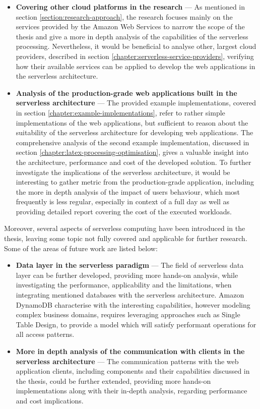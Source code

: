 \begin{itemize}
   \item \textbf{Covering other cloud platforms in the research} ---
   As mentioned in section \ref{section:research-approach}, the research focuses mainly on the services provided by the Amazon Web Services to narrow the scope of the thesis and give a more in depth analysis of the capabilities of the serverless processing.
   Nevertheless, it would be beneficial to analyse other, largest cloud providers, described in section \ref{chapter:serverless-service-providers}, verifying how their available services can be applied to develop the web applications in the serverless architecture.
   \item \textbf{Analysis of the production-grade web applications built in the serverless architecture} ---
   The provided example implementations, covered in section \ref{chapter:example-implementations}, refer to rather simple implementations of the web applications, but sufficient to reason about the suitability of the serverless architecture for developing web applications.
   The comprehensive analysis of the second example implementation, discussed in section \ref{chapter:latex-processing-optimisation}, gives a valuable insight into the architecture, performance and cost of the developed solution.
   To further investigate the implications of the serverless architecture, it would be interesting to gather metric from the production-grade application, including the more in depth analysis of the impact of users behaviour, which most frequently is less regular, especially in context of a full day as well as providing detailed report covering the cost of the executed workloads.
\end{itemize}

Moreover, several aspects of serverless computing have been introduced in the thesis, leaving some topic not fully covered and applicable for further research.
Some of the areas of future work are listed below:

\begin{itemize}
   \item \textbf{Data layer in the serverless paradigm} ---
   The field of serverless data layer can be further developed, providing more hands-on analysis, while investigating the performance, applicability and the limitations, when integrating mentioned databases with the serverless architecture.
   Amazon DynamoDB characterise with the interesting capabilities, however modeling complex business domains, requires leveraging approaches such as Single Table Design, to provide a model which will satisfy performant operations for all access patterns.
   \item \textbf{More in depth analysis of the communication with clients in the serverless architecture} ---
   The communication patterns with the web application clients, including components and their capabilities discussed in the thesis, could be further extended, providing more hands-on implementations along with their in-depth analysis, regarding performance and cost implications.
\end{itemize}

